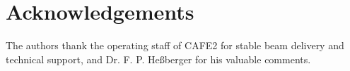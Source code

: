 \documentclass[final,5p,times,twocolumn,number,sort&compress]{elsarticle}
\begin{document}





\section*{Acknowledgements}

The authors thank the operating staff of CAFE2 for stable beam delivery and technical support, and Dr. F. P. Heßberger for his valuable comments.



\end{document}
